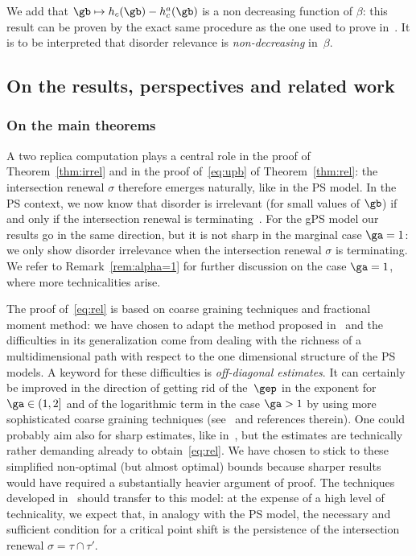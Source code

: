 We add that $\gb\mapsto h_c(\gb)-h_c^{a}(\gb)$ is a non decreasing function of $\beta$: this result can be proven by the exact same procedure as the one used to prove in~\cite[Proposition~6.1]{cf:GLT11}. It is to be interpreted that disorder relevance is \emph{non-decreasing} in~$\beta$.

\subsection{On the results, perspectives and related work}\label{sec:misc}

\subsubsection{On the main theorems}

A two replica computation plays a central role in the proof of Theorem~\ref{thm:irrel} and in the proof of~\eqref{eq:upb} of Theorem~\ref{thm:rel}: the intersection renewal $\sigma$ therefore emerges naturally, like in the PS model. In the PS context, we now know that disorder is irrelevant (for small values of $\gb$) if and only if the intersection renewal is terminating~\cite{cf:BL16}. For the gPS model our results go in the same direction, but it is not sharp in the marginal case $\ga=1$: we only show disorder irrelevance when the intersection renewal $\sigma$ is terminating. We refer to Remark~\ref{rem:alpha=1} for further discussion on the case $\ga=1$, where more technicalities arise.

The proof of~\eqref{eq:rel} is based on coarse graining techniques and fractional moment method: we have chosen to adapt the method proposed in~\cite{cf:DGLT09} and the difficulties in its generalization come from dealing with the richness of a multidimensional path with respect to the one dimensional structure of the PS models. A keyword for these difficulties is \emph{off-diagonal estimates}. It can certainly be improved in the direction of getting rid of the~$\gep$ in the exponent for $\ga \in (1, 2]$ and of the logarithmic term in the case $\ga >1$ by using more sophisticated coarse graining techniques (see~\cite[Chapter~6]{cf:G} and references therein). One could probably aim also for sharp estimates, like in~\cite{cf:BL16}, but the estimates are technically rather demanding already to obtain~\eqref{eq:rel}. We have chosen to stick to these simplified non-optimal (but almost optimal) bounds because sharper results would have required a substantially heavier argument of proof. The techniques developed in~\cite{cf:BL16bis,cf:BL16} should transfer to this model: at the expense of a high level of technicality, we expect that, in analogy with the PS model, the necessary and sufficient condition for a critical point shift is the persistence of the intersection renewal $\sigma=\tau\cap\tau'$.

